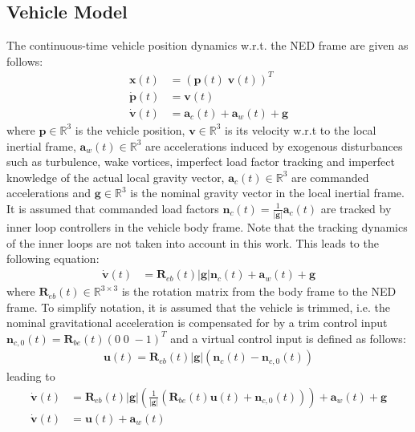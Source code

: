\documentclass{ifacconf}
\providecommand{\mbf}[1]{\mathbf{#1}}
\begin{document}
\subsection{Vehicle Model}
The continuous-time vehicle position dynamics w.r.t. the NED frame are given as follows:
\begin{align}
\mathbf{x}(t) &= (\mbf{p}(t) \; \mbf{v}(t))^T \\
\dot{\mathbf{p}}(t) &= \mbf{v}(t)\\
\dot{\mbf{v}}(t) &= \mbf{a}_{c}(t) + \mbf{a}_w(t) + \mbf{g}
\end{align}
where $\mbf{p} \in \mathbb{R}^3$ is the vehicle position, $\mbf{v} \in \mathbb{R}^3$ is its velocity w.r.t to the local inertial frame, $\mbf{a}_w(t) \in \mathbb{R}^3$ are accelerations induced by exogenous disturbances such as turbulence, wake vortices, imperfect load factor tracking and imperfect knowledge of the actual local gravity vector,  $\mbf{a}_{c}(t) \in \mathbb{R}^3$ are commanded accelerations and $\mbf{g} \in \mathbb{R}^3$ is the nominal gravity vector in the local inertial frame.
It is assumed that commanded load factors $\mbf{n}_c(t) = \frac{1}{|\mbf{g}|} \mbf{a}_c(t)$ are tracked by inner loop controllers in the vehicle body frame.
Note that the tracking dynamics of the inner loops are not taken into account in this work. This leads to the following equation:
\begin{align}
\dot{\mbf{v}}(t) &= \mbf{R}_{eb}(t) |\mbf{g}|\mbf{n}_c(t) + \mbf{a}_w(t) + \mbf{g}
\label{eq:svmloadfactorlevel}
\end{align}
where $\mbf{R}_{eb}(t) \in \mathbb{R}^{3 \times 3}$ is the rotation matrix from the body frame to the NED frame. To simplify notation, it is assumed that the vehicle is trimmed, i.e. the nominal gravitational acceleration is compensated for by a trim control input $\mbf{n}_{c,0}(t) = \mbf{R}_{be}(t)(0 \; 0 \; -1)^{T}$ and a virtual control input is defined as follows:
\begin{align}
\mbf{u} (t)= \mbf{R}_{eb}(t) |\mbf{g}|(\mbf{n}_c(t) - \mbf{n}_{c,0}(t))	
\label{eq:defushort}
\end{align}
leading to
\begin{align}
\dot{\mbf{v}}(t) &= \mbf{R}_{eb}(t)|\mbf{g}|
(
\frac{1}{|\mbf{g}|}
(\mbf{R}_{be}(t) \mbf{u}(t) + \mbf{n}_{c,0}(t))
) + \mbf{a}_w(t) + \mbf{g}\\
\dot{\mbf{v}}(t) &= \mbf{u}(t) + \mbf{a}_w(t)
\label{eq:svmshort}
\end{align}
\end{document}
